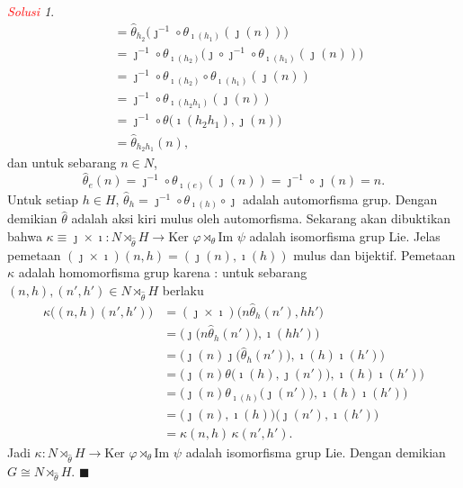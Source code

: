 \documentclass[11pt]{article}
\theoremstyle{definition}
\theoremstyle{remark}
\newtheorem*{solution}{\textcolor{red}{Solusi}}
\newcommand{\image}{\text{Im }}             %
\newcommand{\kernel}{\text{Ker }}           %
\begin{document}
\begin{solution}
\begin{align*}
    &= \hat{\theta}_{h_2} \Big( \jmath^{-1} \circ \theta_{\imath(h_1)}(\jmath(n)) \Big) \\
    &= \jmath^{-1} \circ \theta_{\imath(h_2)} \Big( \jmath \circ \jmath^{-1} \circ \theta_{\imath(h_1)}(\jmath(n)) \Big) \\
    &= \jmath^{-1} \circ \theta_{\imath(h_2)} \circ \theta_{\imath(h_1)} (\jmath(n)) \\
    &=\jmath^{-1} \circ  \theta_{\imath(h_2h_1)} (\jmath(n)) \\
    &=\jmath^{-1} \circ \theta \Big( \imath(h_2h_1), \jmath(n) \Big) \\
    &= \hat{\theta}_{h_2h_1} (n),
\end{align*}
dan untuk sebarang $n \in N$, 
$$
\hat{\theta}_e(n) = \jmath^{-1} \circ \theta_{\imath(e)} (\jmath(n)) = \jmath^{-1} \circ \jmath(n) = n.
$$
Untuk setiap $h \in H$, $\hat{\theta}_h = \jmath^{-1} \circ \theta_{\imath(h)} \circ \jmath$ adalah automorfisma grup. Dengan demikian $\hat{\theta}$ adalah aksi kiri mulus oleh automorfisma. Sekarang akan dibuktikan bahwa $\kappa \equiv \jmath \times \imath : N \rtimes_{\hat{\theta}} H \to \kernel \varphi \rtimes_{\theta} \image \psi$ adalah isomorfisma grup Lie. Jelas pemetaan $(\jmath \times \imath) (n,h) = (\jmath(n), \imath(h))$ mulus dan bijektif. Pemetaan $\kappa$ adalah homomorfisma grup karena : untuk sebarang $(n,h),(n',h') \in N \rtimes_{\hat{\theta}} H $ berlaku 
\begin{align*}
    \kappa \big( (n,h)(n',h') \big) &= (\jmath \times \imath) \big( n\hat{\theta}_{h}(n'), hh' \big) \\
    &= \Big( \jmath\big(n\hat{\theta}_h(n')\big) , \imath(hh') \Big) \\
    &=\Big( \jmath(n) \jmath\big( \hat{\theta}_h (n')\big), \imath(h)\imath(h') \Big) \\
    &= \Big( \jmath(n) \theta\big( \imath(h), \jmath(n')\big), \imath(h) \imath(h') \Big)\\
    &=\Big( \jmath(n) \theta_{\imath(h)}\big(\jmath(n')\big), \imath(h)\imath(h') \Big) \\
    &= \big(\jmath(n),\imath(h)\big) \big( \jmath(n'),\imath(h') \big) \\
    &= \kappa(n,h) \, \kappa(n',h').
\end{align*}
Jadi $\kappa :  N \rtimes_{\hat{\theta}} H \to \kernel \varphi \rtimes_{\theta} \image \psi$ adalah isomorfisma grup Lie. Dengan demikian $G \cong  N \rtimes_{\hat{\theta}} H$. $\blacksquare$
\end{solution}
\end{document}
